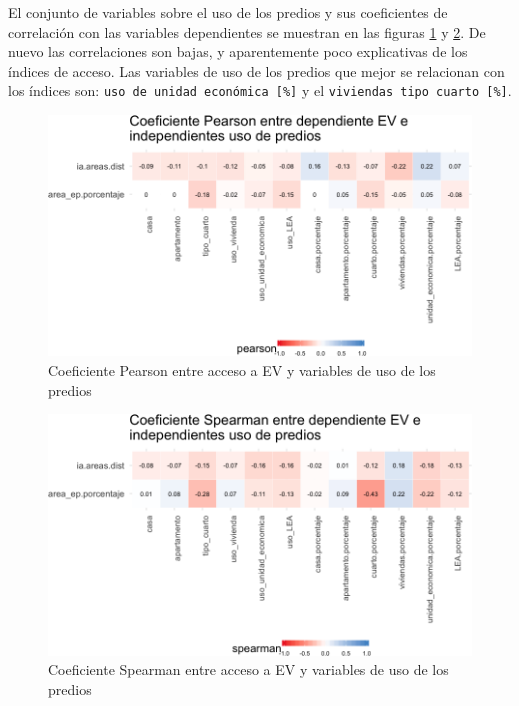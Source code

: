 \documentclass[12pt,a4paper,oneside, openany]{book}
\theoremstyle{definition}
\theoremstyle{definition}
\theoremstyle{definition}
\theoremstyle{remark}
\begin{document}
El conjunto de variables sobre el uso de los predios y sus coeficientes
de correlación con las variables dependientes se muestran en las figuras
\ref{fig:tile-ev-uso-pearson} y \ref{fig:tile-ev-uso-spearman}. De nuevo
las correlaciones son bajas, y aparentemente poco explicativas de los
índices de acceso. Las variables de uso de los predios que mejor se
relacionan con los índices son:
\texttt{uso\ de\ unidad\ económica\ {[}\%{]}} y el
\texttt{viviendas\ tipo\ cuarto\ {[}\%{]}}.

\begin{figure}[H]

{\centering \includegraphics[width=1\linewidth]{tesis-unigis_files/figure-latex/tile-ev-uso-pearson-1} 

}

\caption{Coeficiente Pearson entre acceso a EV y variables de uso de los predios}\label{fig:tile-ev-uso-pearson}
\end{figure}

\begin{figure}[H]

{\centering \includegraphics[width=1\linewidth]{tesis-unigis_files/figure-latex/tile-ev-uso-spearman-1} 

}

\caption{Coeficiente Spearman entre acceso a EV y variables de uso de los predios}\label{fig:tile-ev-uso-spearman}
\end{figure}
\end{document}
